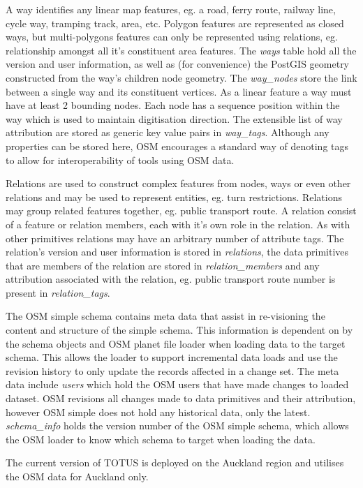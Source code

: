 A way identifies any linear map features, eg. a road, ferry route,
railway line, cycle way, tramping track, area, etc. Polygon features
are represented as closed ways, but multi-polygons features can only be
represented using relations, eg. relationship amongst all
it's constituent area features. The
\textit{ways} table hold all the version and user
information, as well as (for convenience) the PostGIS geometry
constructed from the way's children node geometry. The
\textit{way\_nodes} store the link between a single way and
its constituent vertices. As a linear feature a way must have at least
2 bounding nodes. Each node has a sequence position within the way
which is used to maintain digitisation direction. The extensible list
of way attribution are stored as generic key value pairs in
\textit{way\_tags}. Although any properties can be stored
here, OSM encourages a standard way of denoting tags to allow for
interoperability of tools using OSM data.

Relations are used to construct complex features from nodes, ways or
even other relations and may be used to represent entities, eg. turn
restrictions. Relations may group related features together, eg. public
transport route. A relation consist of a feature or relation members,
each with it's own role in the relation. As with other
primitives relations may have an arbitrary number of attribute tags.
The relation's version and user information is stored
in \textit{relations}, the data primitives that are members
of the relation are stored in \textit{relation\_members} and
any attribution associated with the relation, eg. public transport
route number is present in \textit{relation\_tags}.

The OSM simple schema contains meta data that assist in re-visioning the
content and structure of the simple schema. This information is
dependent on by the schema objects and OSM planet file loader when
loading data to the target schema. This allows the loader to support
incremental data loads and use the revision history to only update the
records affected in a change set. The meta data include
\textit{users} which hold the OSM users that have made
changes to loaded dataset. OSM revisions all changes made to data
primitives and their attribution, however OSM simple does not hold any
historical data, only the latest. \textit{schema\_info}
holds the version number of the OSM simple schema, which allows the OSM
loader to know which schema to target when loading the data.

The current version of TOTUS is deployed on the Auckland region and
utilises the OSM data for Auckland only.

